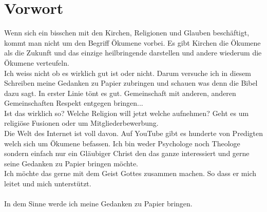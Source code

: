\section{Vorwort}

Wenn sich ein bisschen mit den Kirchen, Religionen und Glauben beschäftigt, kommt man nicht um den Begriff Ökumene vorbei. Es gibt Kirchen die Ökumene als die Zukunft und das einzige heilbringende darstellen und andere wiederum die Ökumene verteufeln.\\
Ich weiss nicht ob es wirklich gut ist oder nicht. Darum versuche ich in diesem Schreiben meine Gedanken zu Papier zubringen und schauen was denn die Bibel dazu sagt. In erster Linie tönt es gut. Gemeinschaft mit anderen, anderen Gemeinschaften Respekt entgegen bringen...\\
Ist das wirklich so? Welche Religion will jetzt welche aufnehmen? Geht es um religiöse Fusionen oder um Mitgliederbewerbung. \\ 
Die Welt des Internet ist voll davon. Auf YouTube gibt es hunderte von Predigten welch sich um Ökumene befassen. Ich bin weder Psychologe noch Theologe sondern einfach nur ein Gläubiger Christ den das ganze interessiert und gerne seine Gedanken zu Papier bringen möchte.\\
Ich möchte das gerne mit dem Geist Gottes zusammen machen. So dass er mich leitet und mich unterstützt.\\\\

In dem Sinne werde ich meine Gedanken zu Papier bringen.





